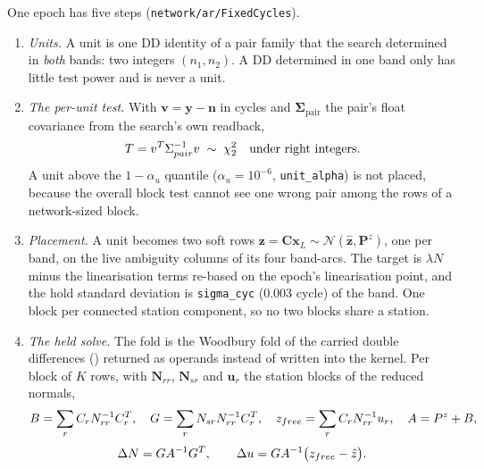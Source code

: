 \documentclass[main.tex]{subfiles}
\begin{document}
One epoch has five steps (\texttt{network/ar/FixedCycles}).
\begin{enumerate}[leftmargin=*, itemsep=0pt]
\item \emph{Units.}  A unit is one DD identity of a pair family that the search
  determined in \emph{both} bands: two integers $(n_1,n_2)$.  A DD determined
  in one band only has little test power and is never a unit.
\item \emph{The per-unit test.}  With $\bm{v} = \bm{y} - \bm{n}$ in cycles and
  $\bm{\Sigma}_{\mathrm{pair}}$ the pair's float covariance from the search's own
  readback,
  \begin{equation}
  T = v^{T}\Sigma_{pair}^{-1}v \;\sim\; \chi^2_2
  \quad\text{under right integers.}
  \label{eq:fc-unit}
  \end{equation}
  A unit above the $1-\alpha_u$ quantile ($\alpha_u = 10^{-6}$,
  \texttt{unit\_alpha}) is not placed, because the overall block test cannot
  see one wrong pair among the rows of a network-sized block.
\item \emph{Placement.}  A unit becomes two soft rows
  $\bm{z} = \bm{C}\bm{x}_L \sim \mathcal{N}(\hat{\bm{z}}, \bm{P}^z)$, one per
  band, on the live ambiguity columns of its four band-arcs.  The target is
  $\lambda N$ minus the linearisation terms re-based on the epoch's
  linearisation point, and the hold standard deviation is
  \texttt{sigma\_cyc} ($0.003$ cycle) of the band.  One block per connected
  station component, so no two blocks share a station.
\item \emph{The held solve.}  The fold is the Woodbury fold of the carried
  double differences () returned as operands instead of written into
  the kernel.  Per block of $K$ rows, with $\bm{N}_{rr}$, $\bm{N}_{sr}$ and
  $\bm{u}_r$ the station blocks of the reduced normals,
  \begin{equation}
  B = \sum_r C_rN_{rr}^{-1}C_r^{T},
  \quad
  G = \sum_r N_{sr}N_{rr}^{-1}C_r^{T},
  \quad
  z_{free} = \sum_r C_rN_{rr}^{-1}u_r,
  \quad
  A = P^z + B,
  \label{eq:fc-operands}
  \end{equation}
  \begin{equation}
  \Delta N = GA^{-1}G^{T},
  \qquad
  \Delta u = GA^{-1}\bigl(z_{free} - \hat{z}\bigr).
  \label{eq:fc-fold}
  \end{equation}

\end{enumerate}
\end{document}

